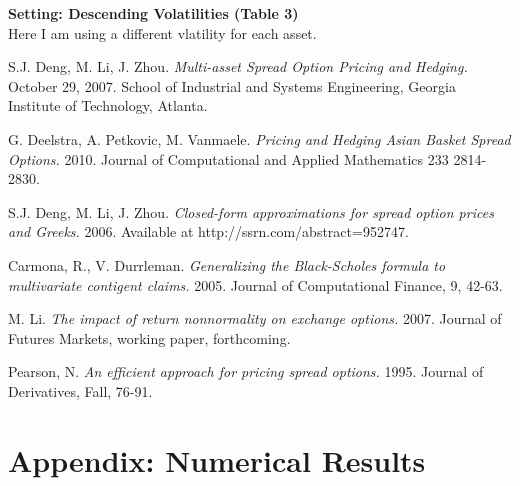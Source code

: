 \documentclass[a4paper]{article}
\begin{document}
{
\textbf{Setting: Descending Volatilities (Table 3)}\\
}
Here I am using a different vlatility for each asset. 

\newpage
\begin{thebibliography}{1}
S.J. Deng, M. Li, J. Zhou.
\textit{Multi-asset Spread Option Pricing and Hedging.}
October 29, 2007. School of Industrial and Systems Engineering, Georgia Institute of Technology, Atlanta.

G. Deelstra, A. Petkovic, M. Vanmaele.
\textit{Pricing and Hedging Asian Basket Spread Options.}
2010. Journal of Computational and Applied Mathematics 233 2814-2830.

S.J. Deng, M. Li,  J. Zhou. 
\textit{Closed-form approximations for spread option prices and Greeks.} 2006.
Available at http://ssrn.com/abstract=952747.

Carmona, R., V. Durrleman. 
\textit{Generalizing the Black-Scholes formula to multivariate contigent claims.} 2005. Journal of Computational Finance, 9, 42-63.

M. Li.
\textit{The impact of return nonnormality on exchange options.} 2007.
Journal of Futures Markets, working paper, forthcoming.

Pearson, N. 
\textit{An efficient approach for pricing spread options.} 1995. Journal of Derivatives, Fall, 76-91.

\end{thebibliography}

\newpage
\section{Appendix: Numerical Results}
\label{sec:appendix}
\end{document}
